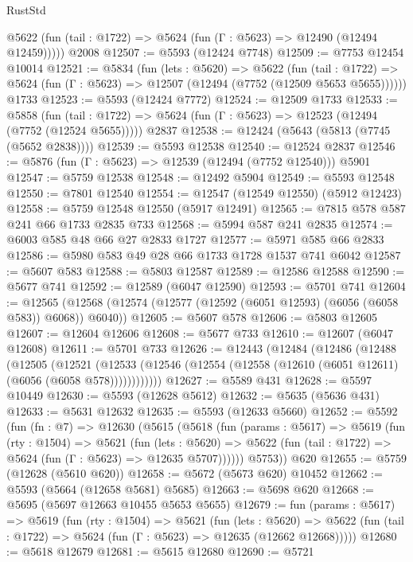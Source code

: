 \begin{lexlean}{RustStd}
\begin{coremodule}
      @5622 (fun (tail : @1722) => @5624 (fun (Γ : @5623) => @12490 (@12494 @12459)))))
    @2008
@12507 := @5593 (@12424 @7748)
@12509 := @7753 @12454 @10014
@12521 := @5834
    (fun (lets : @5620) =>
    @5622
      (fun (tail : @1722) =>
      @5624 (fun (Γ : @5623) => @12507 (@12494 (@7752 (@12509 @5653 @5655))))))
    @1733
@12523 := @5593 (@12424 @7772)
@12524 := @12509 @1733
@12533 := @5858
    (fun (tail : @1722) => @5624 (fun (Γ : @5623) => @12523 (@12494 (@7752 (@12524 @5655)))))
    @2837
@12538 := @12424 (@5643 (@5813 (@7745 (@5652 @2838))))
@12539 := @5593 @12538
@12540 := @12524 @2837
@12546 := @5876 (fun (Γ : @5623) => @12539 (@12494 (@7752 @12540))) @5901
@12547 := @5759 @12538
@12548 := @12492 @5904
@12549 := @5593 @12548
@12550 := @7801 @12540
@12554 := @12547 (@12549 @12550) (@5912 @12423)
@12558 := @5759 @12548 @12550 (@5917 @12491)
@12565 := @7815 @578 @587 @241 @66 @1733 @2835 @733
@12568 := @5994 @587 @241 @2835
@12574 := @6003 @585 @48 @66 @27 @2833 @1727
@12577 := @5971 @585 @66 @2833
@12586 := @5980 @583 @49 @28 @66 @1733 @1728 @1537 @741 @6042
@12587 := @5607 @583
@12588 := @5803 @12587
@12589 := @12586 @12588
@12590 := @5677 @741
@12592 := @12589 (@6047 @12590)
@12593 := @5701 @741
@12604 := @12565 (@12568 (@12574 (@12577 (@12592 (@6051 @12593) (@6056 (@6058 @583)) @6068)) @6040))
@12605 := @5607 @578
@12606 := @5803 @12605
@12607 := @12604 @12606
@12608 := @5677 @733
@12610 := @12607 (@6047 @12608)
@12611 := @5701 @733
@12626 := @12443
    (@12484
      (@12486
        (@12488
          (@12505
            (@12521
              (@12533 (@12546 (@12554 (@12558 (@12610 (@6051 @12611) (@6056 (@6058 @578))))))))))))
@12627 := @5589 @431
@12628 := @5597 @10449
@12630 := @5593 (@12628 @5612)
@12632 := @5635 (@5636 @431)
@12633 := @5631 @12632
@12635 := @5593 (@12633 @5660)
@12652 := @5592
    (fun (fn : @7) =>
    @12630
      (@5615
        (@5618
          (fun (params : @5617) =>
          @5619
            (fun (rty : @1504) =>
            @5621
              (fun (lets : @5620) =>
              @5622 (fun (tail : @1722) => @5624 (fun (Γ : @5623) => @12635 @5707))))))
        @5753))
    @620
@12655 := @5759 (@12628 (@5610 @620))
@12658 := @5672 (@5673 @620) @10452
@12662 := @5593 (@5664 (@12658 @5681) @5685)
@12663 := @5698 @620
@12668 := @5695 (@5697 @12663 @10455 @5653 @5655)
@12679 := fun (params : @5617) =>
  @5619
    (fun (rty : @1504) =>
    @5621
      (fun (lets : @5620) =>
      @5622 (fun (tail : @1722) => @5624 (fun (Γ : @5623) => @12635 (@12662 @12668)))))
@12680 := @5618 @12679
@12681 := @5615 @12680
@12690 := @5721

\end{coremodule}
\end{lexlean}
